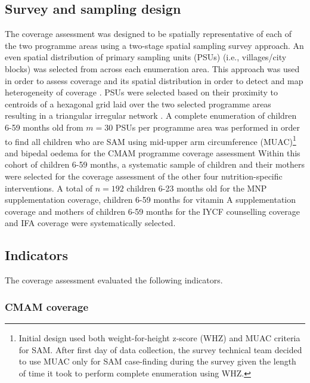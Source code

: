 \documentclass[12pt,a4paper]{article}
\let\rmarkdownfootnote\footnote%
\def\footnote{\protect\rmarkdownfootnote}
\begin{document}
\hypertarget{sample-design}{%
\subsection{Survey and sampling design}\label{sample-design}}

The coverage assessment was designed to be spatially representative of each of the two programme areas using a two-stage spatial sampling survey approach. An even spatial distribution of primary sampling units (PSUs) (i.e., villages/city blocks) was selected from across each enumeration area. This approach was used in order to assess coverage and its spatial distribution in order to detect and map heterogeneity of coverage \citep[\citet{Diggle:2014tk}]{Elliott:2004cg}. PSUs were selected based on their proximity to centroids of a hexagonal grid laid over the two selected programme areas resulting in a triangular irregular network \citep[\citet{Elliot:2000vs}]{Isaaks:1989uk}. A complete enumeration of children 6-59 months old from \(m = 30\) PSUs per programme area was performed in order to find all children who are SAM using mid-upper arm circumference (MUAC)\footnote{Initial design used both weight-for-height z-score (WHZ) and MUAC criteria for SAM. After first day of data collection, the survey technical team decided to use MUAC only for SAM case-finding during the survey given the length of time it took to perform complete enumeration using WHZ.} and bipedal oedema for the CMAM programme coverage assessment Within this cohort of children 6-59 months, a systematic sample of children and their mothers were selected for the coverage assessment of the other four nutrition-specific interventions. A total of \(n = 192\) children 6-23 months old for the MNP supplementation coverage, children 6-59 months for vitamin A supplementation coverage and mothers of children 6-59 months for the IYCF counselling coverage and IFA coverage were systematically selected.

\hypertarget{indicators}{%
\subsection{Indicators}\label{indicators}}

The coverage assessment evaluated the following indicators.

\hypertarget{cmam-coverage}{%
\subsubsection{CMAM coverage}\label{cmam-coverage}}
\end{document}
